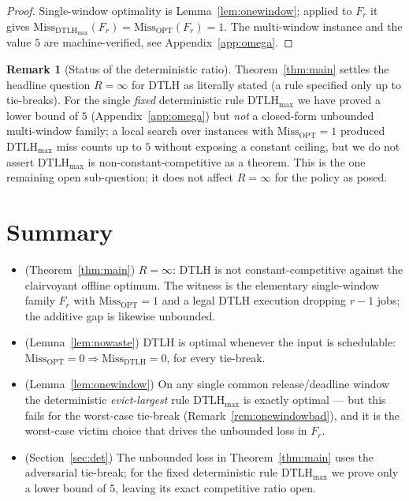 \documentclass{amsart}
\theoremstyle{definition}
\newtheorem{remark}[theorem]{Remark}
\begin{document}
\begin{proof}
Single-window optimality is Lemma~\ref{lem:onewindow}; applied to $F_r$ it gives
$\mathrm{Miss}_{\mathrm{DTLH}_{\max}}(F_r)=\mathrm{Miss}_{\mathrm{OPT}}(F_r)=1$.
The multi-window instance and the value $5$ are machine-verified, see
Appendix~\ref{app:omega}.
\end{proof}

\begin{remark}[Status of the deterministic ratio]\label{rem:detopen}
Theorem~\ref{thm:main} settles the headline question $R=\infty$ for DTLH as
literally stated (a rule specified only up to tie-breaks). For the single
\emph{fixed} deterministic rule $\mathrm{DTLH}_{\max}$ we have proved a lower
bound of $5$ (Appendix~\ref{app:omega}) but \emph{not} a closed-form unbounded
multi-window family; a local search over instances with
$\mathrm{Miss}_{\mathrm{OPT}}=1$ produced $\mathrm{DTLH}_{\max}$ miss counts up
to $5$ without exposing a constant ceiling, but we do not assert
$\mathrm{DTLH}_{\max}$ is non-constant-competitive as a theorem. This is the one
remaining open sub-question; it does not affect $R=\infty$ for the policy as
posed.
\end{remark}

\section{Summary}

\begin{itemize}
\item (Theorem~\ref{thm:main}) $R=\infty$: DTLH is not constant-competitive
against the clairvoyant offline optimum. The witness is the elementary
single-window family $F_r$ with $\mathrm{Miss}_{\mathrm{OPT}}=1$ and a legal DTLH
execution dropping $r-1$ jobs; the additive gap is likewise unbounded.
\item (Lemma~\ref{lem:nowaste}) DTLH is optimal whenever the input is
schedulable: $\mathrm{Miss}_{\mathrm{OPT}}=0\Rightarrow
\mathrm{Miss}_{\mathrm{DTLH}}=0$, for every tie-break.
\item (Lemma~\ref{lem:onewindow}) On any single common release/deadline window
the deterministic \emph{evict-largest} rule $\mathrm{DTLH}_{\max}$ is exactly
optimal --- but this fails for the worst-case tie-break
(Remark~\ref{rem:onewindowbad}), and it is the worst-case victim choice that
drives the unbounded loss in $F_r$.
\item (Section~\ref{sec:det}) The unbounded loss in Theorem~\ref{thm:main} uses
the adversarial tie-break; for the fixed deterministic rule
$\mathrm{DTLH}_{\max}$ we prove only a lower bound of $5$, leaving its exact
competitive ratio open.
\end{itemize}
\end{document}
